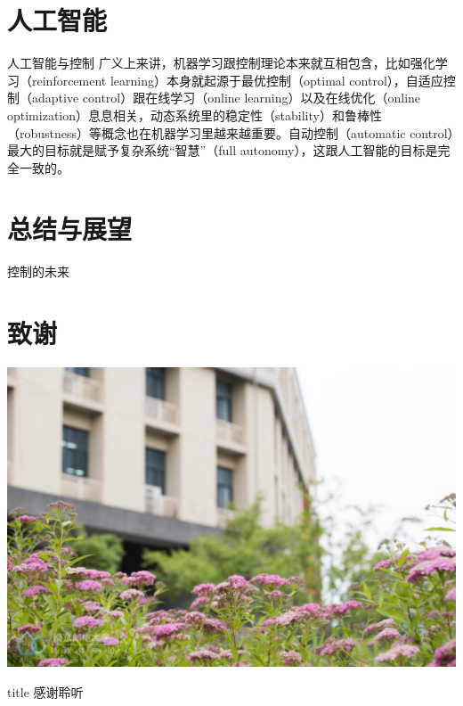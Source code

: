 \documentclass[10pt]{ctexbeamer}
\begin{document}
\section{人工智能}

\begin{frame}{人工智能与控制}
  广义上来讲，机器学习跟控制理论本来就互相包含，比如强化学习（reinforcement learning）本身就起源于最优控制（optimal control），自适应控制（adaptive control）跟在线学习（online learning）以及在线优化（online optimization）息息相关，动态系统里的稳定性（stability）和鲁棒性（robustness）等概念也在机器学习里越来越重要。自动控制（automatic control）最大的目标就是赋予复杂系统“智慧”（full autonomy），这跟人工智能的目标是完全一致的。
\end{frame}

\section{总结与展望}
    \begin{frame}{控制的未来}
    \end{frame}



\section*{致谢}  
{
  \centering
  \includegraphics[trim=0 100 0 0,height=\paperheight,angle=0]{pic/njupt.flower.pdf}
}
\begin{frame}
\vfill
\centering
\begin{beamercolorbox}[sep=8pt,center,shadow=true,rounded=true]{title}
  \Huge{感谢聆听}
\end{beamercolorbox}
\vfill
\end{frame}
\end{document}
